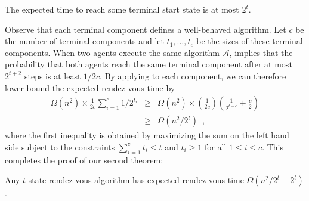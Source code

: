 \documentclass[lotsofwhite]{patmorin}
\begin{document}
\begin{lem}
The expected time to reach some terminal start state is at most $2^t$.
\end{lem}

Observe that each terminal component defines a well-behaved algorithm.
Let $c$ be the number of terminal components and let $t_1,\ldots,t_c$ be
the sizes of these terminal components.  When two agents execute the same
algorithm $\mathcal{A}$,  implies that the probability
that both agents reach the same terminal component after at most $2^{t+2}$
steps is at least $1/2c$.  By applying  to each component, we can therefore lower bound the expected rendez-vous time by
\begin{eqnarray*}
  \Omega(n^2)\times \frac{1}{2c}\sum_{i=1}^c 1/2^{t_i} 
    & \ge & \Omega(n^2)\times \left(\frac{1}{2c}\right)\left(\frac{1}{2^{t-c}}+\frac{c}{2}\right) \\
    & \ge & \Omega(n^2/2^t) \enspace ,
\end{eqnarray*}
where the first inequality is obtained by maximizing the sum on the
left hand side subject to the constraints $\sum_{i=1}^c t_i \le t$
and $t_i \ge 1$ for all $1\le i\le c$.  This completes the proof of
our second theorem:

\begin{thm}
Any $t$-state rendez-vous algorithm has expected rendez-vous time
$\Omega(n^2/2^t-2^t)$.
\end{thm}



\end{document}
